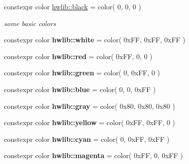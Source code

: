 \begin{DoxyCompactItemize}
\item 
\mbox{\label{namespacehwlib_aa9c056fa29bc9af9f55d4b774bb3898a}} 
constexpr color \hyperlink{namespacehwlib_aa9c056fa29bc9af9f55d4b774bb3898a}{hwlib\+::black} = color( 0, 0, 0 )
\begin{DoxyCompactList}\small\item\em some basic colors \end{DoxyCompactList}\item 
\mbox{\label{namespacehwlib_a4ef9e33ddbcac5e4dc5cf3190f9174a9}} 
constexpr color {\bfseries hwlib\+::white} = color( 0x\+F\+F, 0x\+F\+F, 0x\+F\+F )
\item 
\mbox{\label{namespacehwlib_a5b1deea018f5b78012a5556553740614}} 
constexpr color {\bfseries hwlib\+::red} = color( 0x\+F\+F, 0, 0 )
\item 
\mbox{\label{namespacehwlib_a2473de6d95a7df78dac207d1b7e87c5c}} 
constexpr color {\bfseries hwlib\+::green} = color( 0, 0x\+F\+F, 0 )
\item 
\mbox{\label{namespacehwlib_ae1184edd3998bcdb7061c0b1d38683b7}} 
constexpr color {\bfseries hwlib\+::blue} = color( 0, 0, 0x\+F\+F )
\item 
\mbox{\label{namespacehwlib_a2e05dcb77590ae391ad3027f4097ec77}} 
constexpr color {\bfseries hwlib\+::gray} = color( 0x80, 0x80, 0x80 )
\item 
\mbox{\label{namespacehwlib_a5f5e78ccc187ac0649358ce77cb7173f}} 
constexpr color {\bfseries hwlib\+::yellow} = color( 0x\+F\+F, 0x\+F\+F, 0 )
\item 
\mbox{\label{namespacehwlib_a2de8bf807b29ec14038fbb448ad4e0e7}} 
constexpr color {\bfseries hwlib\+::cyan} = color( 0, 0x\+F\+F, 0x\+F\+F )
\item 
\mbox{\label{namespacehwlib_aa4d44b5166927127648eeae921596181}} 
constexpr color {\bfseries hwlib\+::magenta} = color( 0x\+F\+F, 0, 0x\+F\+F )
\item 
\mbox{\label{namespacehwlib_a5f2e4acc938c57f1e6030e0656510c21}} 

\end{DoxyCompactItemize}
